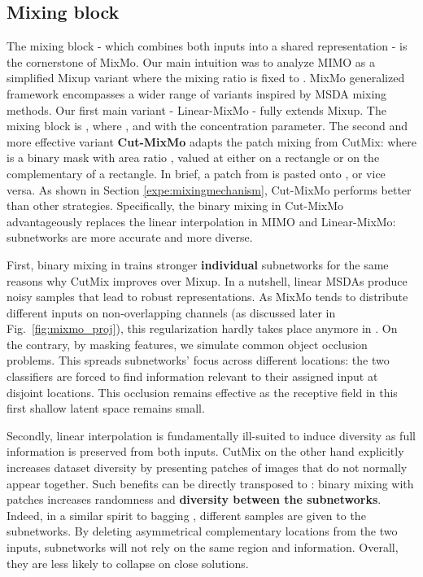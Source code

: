 \documentclass[10pt,twocolumn,letterpaper]{article}
\begin{document}
\subsection{Mixing block }
\label{section:fusion}
The mixing block  - which combines both inputs into a shared representation - is the cornerstone of MixMo.
Our main intuition was to analyze MIMO as a simplified Mixup variant where the mixing ratio  is fixed to .
MixMo generalized framework encompasses a wider range of variants inspired by MSDA mixing methods. 
Our first main variant - Linear-MixMo - fully extends Mixup. The mixing block is , where ,  and  with  the concentration parameter. The second and more effective variant \textbf{Cut-MixMo} adapts the patch mixing from CutMix:
\noindent where  is a binary mask with area ratio , valued at  either on a rectangle or on the complementary of a rectangle.
In brief, a patch from  is pasted onto , or vice versa.
As shown in Section \ref{expe:mixingmechanism}, Cut-MixMo performs better than other strategies.
Specifically, the binary mixing in Cut-MixMo advantageously replaces the linear interpolation in MIMO and Linear-MixMo: subnetworks are more accurate and more diverse.

First, binary mixing in  trains stronger \textbf{individual}
subnetworks for the same reasons why CutMix improves over Mixup.
In a nutshell, linear MSDAs \cite{manifoldmixup19,zhang2018mixup} produce noisy samples \cite{onmixup2020} that lead to robust representations.
As MixMo tends to distribute different inputs on
non-overlapping channels (as discussed later in Fig.~\ref{fig:mixmo_proj}), this regularization hardly takes place anymore in
.
On the contrary, by masking features,
we simulate common object occlusion problems. This spreads
subnetworks' focus across different locations: the two classifiers are forced to
find information relevant to their assigned input at disjoint locations. This
occlusion remains effective as the receptive field in this first shallow latent
space remains small.

Secondly, linear interpolation is fundamentally ill-suited to induce
diversity as
full information is preserved from both inputs.
CutMix on the other hand explicitly increases dataset diversity by presenting
patches of images that do not normally appear together.
Such benefits can be directly transposed to :
binary mixing with patches increases randomness and \textbf{diversity between the subnetworks}.
Indeed, in a similar spirit to bagging
\cite{breiman1996bagging}, different samples are given to the subnetworks. By
deleting asymmetrical complementary locations from the two inputs, subnetworks
will not rely on the same region and information. Overall, they are less likely
to collapse on close solutions.
\end{document}
